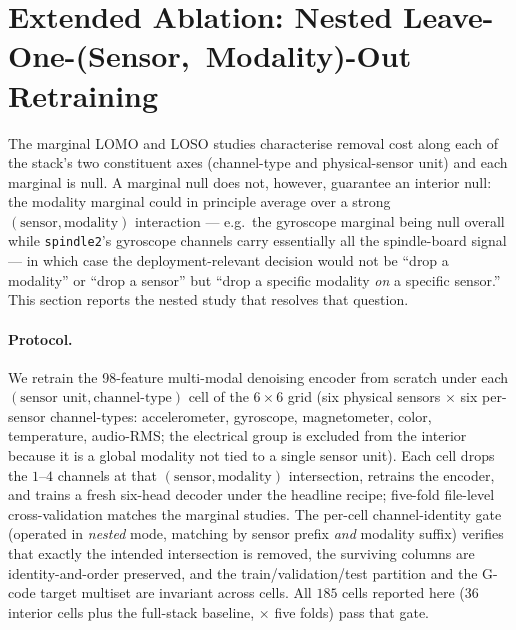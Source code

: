 \documentclass[11pt,a4paper]{article}
\begin{document}
\section{Extended Ablation: Nested Leave-One-(Sensor,~Modality)-Out Retraining}
\label{app:nested-lomo}
\label{sec:abl-lomo-nested}

The marginal LOMO and LOSO studies characterise removal cost along each of the stack's two constituent axes (channel-type and physical-sensor unit) and each marginal is null. A marginal null does not, however, guarantee an interior null: the modality marginal could in principle average over a strong $(\text{sensor},\text{modality})$ interaction --- e.g.\ the gyroscope marginal being null overall while \texttt{spindle2}'s gyroscope channels carry essentially all the spindle-board signal --- in which case the deployment-relevant decision would not be ``drop a modality'' or ``drop a sensor'' but ``drop a specific modality \emph{on} a specific sensor.'' This section reports the nested study that resolves that question.

\paragraph{Protocol.} We retrain the 98-feature multi-modal denoising encoder from scratch under each $(\text{sensor unit},\text{channel-type})$ cell of the $6\!\times\!6$ grid (six physical sensors $\times$ six per-sensor channel-types: accelerometer, gyroscope, magnetometer, color, temperature, audio-RMS; the electrical group is excluded from the interior because it is a global modality not tied to a single sensor unit). Each cell drops the $1$--$4$ channels at that $(\text{sensor},\text{modality})$ intersection, retrains the encoder, and trains a fresh six-head decoder under the headline recipe; five-fold file-level cross-validation matches the marginal studies. The per-cell channel-identity gate (operated in \emph{nested} mode, matching by sensor prefix \emph{and} modality suffix) verifies that exactly the intended intersection is removed, the surviving columns are identity-and-order preserved, and the train/validation/test partition and the G-code target multiset are invariant across cells. All $185$ cells reported here ($36$ interior cells plus the full-stack baseline, $\times$ five folds) pass that gate.
\end{document}
